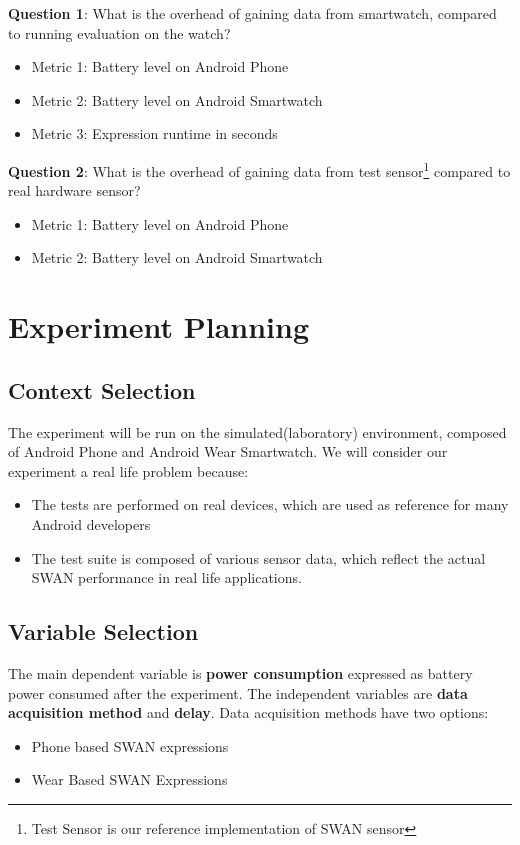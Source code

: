 \textbf{Question 1}: What is the overhead of gaining data from smartwatch, compared to running evaluation on the watch?
\begin{itemize}
  \item Metric 1:  Battery level on Android Phone
  \item Metric 2:  Battery level on Android Smartwatch
  \item  Metric 3:  Expression runtime in seconds
\end{itemize}

\textbf{Question 2}:  What is the overhead of gaining data from test sensor\footnote{Test Sensor is our reference implementation of SWAN sensor} compared to real hardware sensor?
\begin{itemize}
 \item Metric 1:  Battery level on Android Phone
 \item Metric 2: Battery level on Android Smartwatch
\end{itemize}

\section{Experiment Planning}
\subsection{Context Selection}
The experiment will be run on the simulated(laboratory) environment, composed of Android Phone and Android Wear Smartwatch. We will consider our experiment a real life problem because:
\begin{itemize}
 \item The tests are performed on real devices, which are used as reference for many Android developers
 \item The test suite is composed of various sensor data, which reflect the actual SWAN performance in real life applications.
\end{itemize}

\subsection{Variable Selection}

The main dependent variable is \textbf{power consumption} expressed as battery power consumed after the experiment.
The independent variables are \textbf{data acquisition method} and \textbf{delay}.
Data acquisition methods  have two options:
\begin{itemize}
 \item Phone based SWAN expressions
 \item Wear Based SWAN Expressions
\end{itemize}

